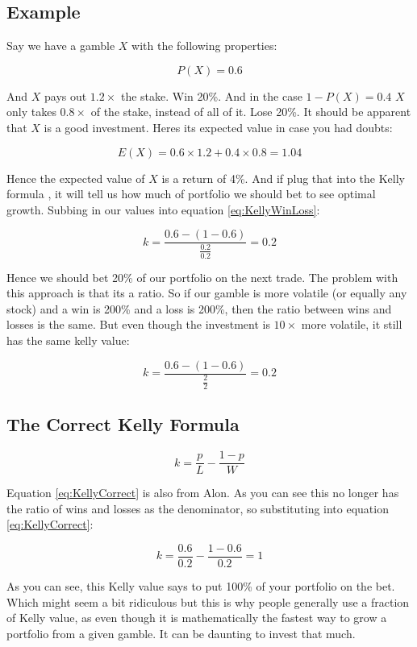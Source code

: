 \documentclass[12pt]{article}
\begin{document}
\subsection{Example}

Say we have a gamble \(X\) with the following properties:

\[P(X) = 0.6\]

And \(X\) pays out \(1.2\times\) the stake. Win 20\%. And in the case \(1 - P(X) = 0.4\) \(X\) 
only takes \(0.8\times\) of the stake, instead of all of it. Lose 20\%. It should be apparent 
that \(X\) is a good investment. Heres its expected value in case you had doubts:

\[E(X) = 0.6 \times 1.2 + 0.4 \times 0.8 = 1.04\]

Hence the expected value of \(X\) is a return of 4\%. And if plug that into the Kelly formula
, it will tell us how much of portfolio we should bet to see optimal growth. Subbing in our
values into equation \ref{eq:KellyWinLoss}:

\[k = \frac{0.6 - (1 - 0.6)}{\frac{0.2}{0.2}} = 0.2\]

Hence we should bet 20\% of our portfolio on the next trade. The problem with this approach 
is that its a ratio. So if our gamble is more volatile (or equally any stock) and a win is 
200\% and a loss is 200\%, then the ratio between wins and losses is the same. But even though 
the investment is \(10\times\) more volatile, it still has the same kelly value:

\[k = \frac{0.6 - (1 - 0.6)}{\frac{2}{2}} = 0.2\]

\subsection{The Correct Kelly Formula}

\begin{equation}\label{eq:KellyCorrect}
    k = \frac{p}{L} - \frac{1 - p}{W}
\end{equation}

Equation \ref{eq:KellyCorrect} is also from Alon\cite{Alon}. As you can see this no longer 
has the ratio of wins and losses as the denominator, so substituting into equation 
\ref{eq:KellyCorrect}:

\[k = \frac{0.6}{0.2} - \frac{1 - 0.6}{0.2} = 1\]

As you can see, this Kelly value says to put 100\% of your portfolio on the bet. Which might 
seem a bit ridiculous but this is why people generally use a fraction of Kelly value, as even 
though it is mathematically the fastest way to grow a portfolio from a given gamble. It can 
be daunting to invest that much.
\end{document}
